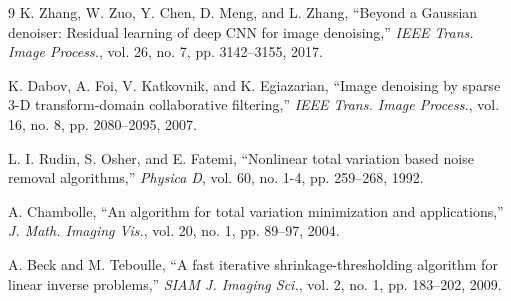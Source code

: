 \documentclass[twocolumn]{article}
\begin{document}
\begin{thebibliography}{9}
K. Zhang, W. Zuo, Y. Chen, D. Meng, and L. Zhang, ``Beyond a Gaussian denoiser: Residual learning of deep CNN for image denoising,'' \textit{IEEE Trans. Image Process.}, vol. 26, no. 7, pp. 3142–3155, 2017.

K. Dabov, A. Foi, V. Katkovnik, and K. Egiazarian, ``Image denoising by sparse 3-D transform-domain collaborative filtering,'' \textit{IEEE Trans. Image Process.}, vol. 16, no. 8, pp. 2080–2095, 2007.

L. I. Rudin, S. Osher, and E. Fatemi, ``Nonlinear total variation based noise removal algorithms,'' \textit{Physica D}, vol. 60, no. 1-4, pp. 259–268, 1992.

A. Chambolle, ``An algorithm for total variation minimization and applications,'' \textit{J. Math. Imaging Vis.}, vol. 20, no. 1, pp. 89–97, 2004.

A. Beck and M. Teboulle, ``A fast iterative shrinkage-thresholding algorithm for linear inverse problems,'' \textit{SIAM J. Imaging Sci.}, vol. 2, no. 1, pp. 183–202, 2009.
\end{thebibliography}

\balance
\end{document}
